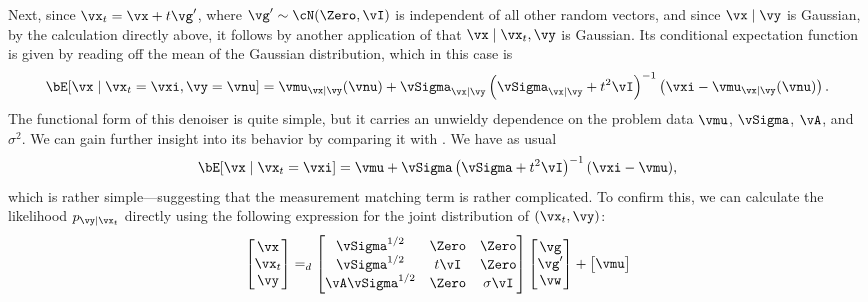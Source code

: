 \documentclass[../../book-main.tex]{subfiles}
\begin{document}
\begin{example}
  Next, since $\vx_t = \vx + t \vg'$, where $\vg' \sim \cN(\Zero, \vI)$ is
  independent of all other random vectors, and since $\vx \mid \vy$ is Gaussian,
  by the calculation directly above, it follows by another
  application of  that $\vx \mid \vx_t, \vy$
  is Gaussian. Its conditional expectation function is given by reading off the
  mean of the Gaussian distribution, which in this case is
  \begin{equation}\label{eq:conditional-posterior-denoiser-gaussian-case}
    \bE[ \vx \mid \vx_t=\vxi, \vy=\vnu ]
    =
    \vmu_{\vx\mid \vy}(\vnu) + \vSigma_{\vx\mid\vy}\left(
    \vSigma_{\vx\mid \vy} + t^2 \vI 
    \right)^{-1}\left(
    \vxi - \vmu_{\vx\mid \vy}(\vnu)
    \right).
  \end{equation}
  The functional form of this denoiser is quite simple, but it carries an
  unwieldy dependence on the problem data $\vmu$, $\vSigma$, $\vA$, and
  $\sigma^2$.
  We can gain further insight into its behavior by comparing it with
  .
  We have as usual
  \begin{equation}\label{eq:posterior-denoiser-gaussian-case}
    \bE[\vx \mid \vx_t=\vxi]
    = \vmu + \vSigma\left(\vSigma + t^2 \vI\right)^{-1} (\vxi - \vmu),
  \end{equation}
  which is rather simple---suggesting that the measurement matching term is
  rather complicated. To confirm this, we can calculate the likelihood $p_{\vy
  \mid \vx_t}$ directly using the following expression for the joint
  distribution of $(\vx_t, \vy)$:
  \begin{equation}
    \begin{bmatrix}
      \vx \\
      \vx_t \\
      \vy
    \end{bmatrix}
    =_{d}
    \begin{bmatrix}
      \vSigma^{1/2} & \Zero & \Zero \\
      \vSigma^{1/2} & t\vI & \Zero \\
      \vA \vSigma^{1/2} & \Zero & \sigma \vI
    \end{bmatrix}
    \begin{bmatrix}
      \vg \\
      \vg' \\
      \vw
    \end{bmatrix}
    +
    \begin{bmatrix}
      \vmu \\

\end{bmatrix}
\end{equation}
\end{example}
\end{document}
